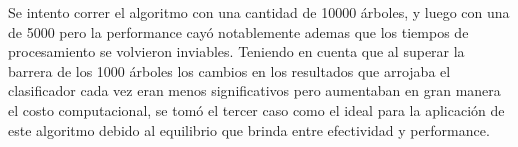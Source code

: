 Se intento correr el algoritmo con una cantidad de 10000 árboles, y luego con una de 5000 pero la performance cayó notablemente ademas que los tiempos de procesamiento se volvieron inviables.
Teniendo en cuenta que al superar la barrera de los 1000 árboles los cambios en los resultados que arrojaba el clasificador cada vez eran menos significativos pero aumentaban en gran manera el costo computacional, se tomó el tercer caso como el ideal para la aplicación de este algoritmo debido al equilibrio que brinda entre efectividad y performance.